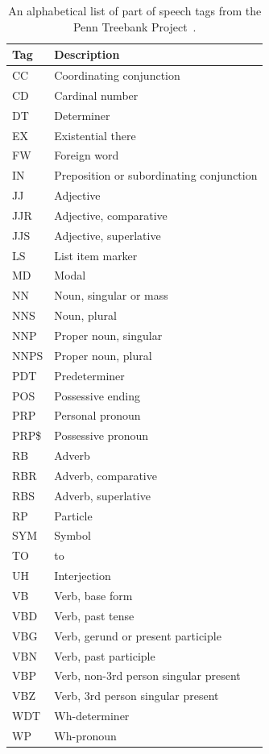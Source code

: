 \begin{table}[H]
\centering
\caption{An alphabetical list of part of speech tags from the Penn Treebank Project~\cite{ref259}.}
\begin{tabular}{ll}
\hline
\textbf{Tag} & \textbf{Description} \\
\hline
CC   & Coordinating conjunction \\
CD   & Cardinal number \\
DT   & Determiner \\
EX   & Existential there \\
FW   & Foreign word \\
IN   & Preposition or subordinating conjunction \\
JJ   & Adjective \\
JJR  & Adjective, comparative \\
JJS  & Adjective, superlative \\
LS   & List item marker \\
MD   & Modal \\
NN   & Noun, singular or mass \\
NNS  & Noun, plural \\
NNP  & Proper noun, singular \\
NNPS & Proper noun, plural \\
PDT  & Predeterminer \\
POS  & Possessive ending \\
PRP  & Personal pronoun \\
PRP\$ & Possessive pronoun \\
RB   & Adverb \\
RBR  & Adverb, comparative \\
RBS  & Adverb, superlative \\
RP   & Particle \\
SYM  & Symbol \\
TO   & to \\
UH   & Interjection \\
VB   & Verb, base form \\
VBD  & Verb, past tense \\
VBG  & Verb, gerund or present participle \\
VBN  & Verb, past participle \\
VBP  & Verb, non-3rd person singular present \\
VBZ  & Verb, 3rd person singular present \\
WDT  & Wh-determiner \\
WP   & Wh-pronoun \\

\end{tabular}
\end{table}

